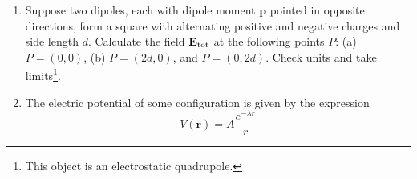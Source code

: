 \documentclass[10pt]{article}
\begin{document}
\begin{enumerate}
\item Suppose two dipoles, each with dipole moment $\mathbf{p}$ pointed in opposite directions, form a square with alternating positive and negative charges and side length $d$.  Calculate the field $\mathbf{E}_{\rm tot}$ at the following points $P$: (a) $P = (0,0)$, (b) $P = (2d,0)$, and $P = (0,2d)$.  Check units and take limits\footnote{This object is an electrostatic quadrupole.}.  \\ \vspace{3cm}
\item The electric potential of some configuration is given by the expression
\begin{equation}
V(\mathbf{r}) = A \frac{e^{-\lambda r}}{r}
\end{equation}
\end{enumerate}
\end{document}

